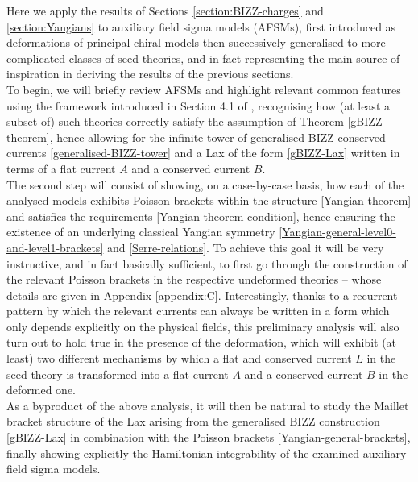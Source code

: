 \documentclass[12pt]{article}
\numberwithin{equation}{section}
\begin{document}
Here we apply the results of Sections \ref{section:BIZZ-charges} and \ref{section:Yangians} to auxiliary field sigma models (AFSMs), first introduced as deformations of principal chiral models \cite{Ferko:2024ali} then successively generalised to more complicated classes of seed theories, and in fact representing the main source of inspiration in deriving the results of the previous sections.\\
\indent
To begin, we will briefly review AFSMs and highlight relevant common features using the framework introduced in Section 4.1 of \cite{Bielli:2025uiv}, recognising how (at least a subset of) such theories correctly satisfy the assumption of Theorem \ref{gBIZZ-theorem}, hence allowing for the infinite tower of generalised BIZZ conserved currents \eqref{generalised-BIZZ-tower} and a Lax of the form \eqref{gBIZZ-Lax} written in terms of a flat current $A$ and a conserved current $B$.\\
\indent
The second step will consist of showing, on a case-by-case basis, how each of the analysed models exhibits Poisson brackets within the structure \eqref{Yangian-theorem} and satisfies the requirements \eqref{Yangian-theorem-condition}, hence ensuring the existence of an underlying classical Yangian symmetry \eqref{Yangian-general-level0-and-level1-brackets} and \eqref{Serre-relations}. To achieve this goal it will be very instructive, and in fact basically sufficient, to first go through the construction of the relevant Poisson brackets in the respective undeformed theories -- whose details are given in Appendix \ref{appendix:C}. Interestingly, thanks to a recurrent pattern by which the relevant currents can always be written in a form which only depends explicitly on the physical fields, this preliminary analysis will also turn out to hold true in the presence of the deformation, which will exhibit (at least) two different mechanisms by which a flat and conserved current $L$ in the seed theory is transformed into a flat current $A$ and a conserved current $B$ in the deformed one.\\
\indent
As a byproduct of the above analysis, it will then be natural to study the Maillet bracket structure of the Lax arising from the generalised BIZZ construction \eqref{gBIZZ-Lax} in combination with the Poisson brackets \eqref{Yangian-general-brackets}, finally showing explicitly the Hamiltonian integrability of the examined auxiliary field sigma models.
\end{document}
